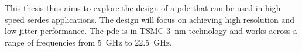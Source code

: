 This thesis thus aims to explore the design of a \gls{pde} that can be used in high-speed \gls{serdes} applications. The design will focus on achieving high resolution and low jitter performance. The \gls{pde} is in TSMC 3~nm technology and works across a range of frequencies from 5~GHz to 22.5~GHz.
